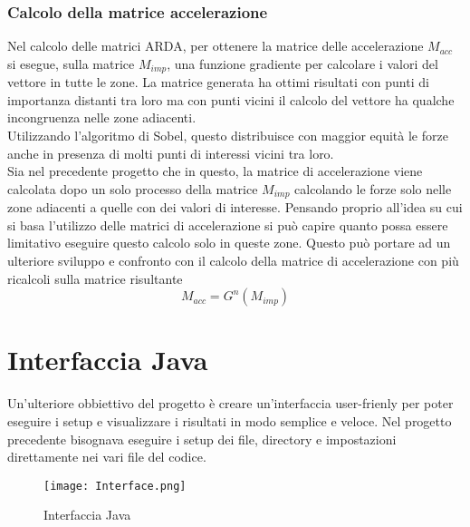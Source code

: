 \subsubsection{Calcolo della matrice accelerazione}
Nel calcolo delle matrici ARDA, per ottenere la matrice delle accelerazione $M_{acc}$ si esegue, sulla
matrice $M_{imp}$, una funzione gradiente per calcolare i valori del vettore in tutte le zone.
La matrice generata ha ottimi risultati con punti di importanza distanti tra loro
ma con punti vicini il calcolo del vettore ha qualche incongruenza nelle zone adiacenti.\\
Utilizzando l'algoritmo di Sobel, questo distribuisce con maggior equit\`a le forze anche in presenza di
molti punti di interessi vicini tra loro.\\
Sia nel precedente progetto che in questo, la matrice di accelerazione viene calcolata dopo un solo processo
della matrice $M_{imp}$ calcolando le forze solo nelle zone adiacenti a quelle con dei valori di interesse.
Pensando proprio all'idea su cui si basa l'utilizzo delle matrici di accelerazione si pu\`o capire quanto possa
essere limitativo eseguire questo calcolo solo in queste zone. Questo pu\`o portare ad un ulteriore sviluppo e
confronto con il calcolo della matrice di accelerazione con pi\`u ricalcoli sulla matrice risultante
\begin{equation}
M_{acc} = G^{n}(M_{imp})
\end{equation}

\section{Interfaccia Java}
Un'ulteriore obbiettivo del progetto \`e creare un'interfaccia user-frienly per poter eseguire i setup e visualizzare
i risultati in modo semplice e veloce. Nel progetto precedente bisognava eseguire i setup dei file,
directory e impostazioni direttamente nei vari file del codice.\\

\begin{figure}[h]
    \begin{center}
    \texttt{[image: Interface.png]}
    \caption[IntJava]{Interfaccia Java}
    \label{etichetta}
    \end{center}
\end{figure}

